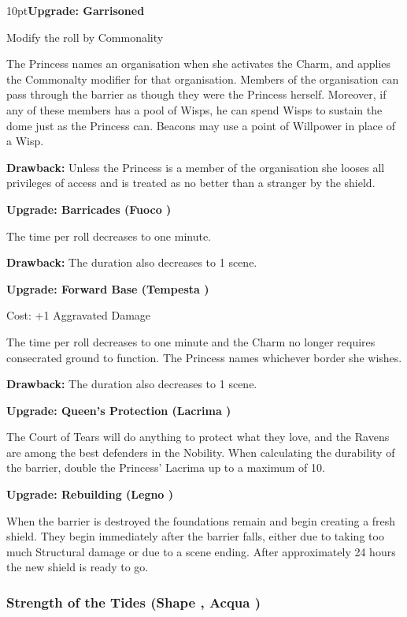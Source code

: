 \begin{myindentpar}{10pt}\textbf{Upgrade: Garrisoned}

Modify the roll by Commonality

The Princess names an organisation when she activates the Charm, and applies the Commonalty modifier for that organisation. Members of the organisation can pass through the barrier as though they were the Princess herself. Moreover, if any of these members has a pool of Wisps, he can spend Wisps to sustain the dome just as the Princess can. Beacons may use a point of Willpower in place of a Wisp. 

\textbf{Drawback:} Unless the Princess is a member of the organisation she looses all privileges of access and is treated as no better than a stranger by the shield.

\textbf{Upgrade: Barricades (Fuoco \textbullet\textbullet\textbullet)}

The time per roll decreases to one minute. 

\textbf{Drawback:} The duration also decreases to 1 scene. 

\textbf{Upgrade: Forward Base (Tempesta \textbullet\textbullet)}

Cost: +1 Aggravated Damage

The time per roll decreases to one minute and the Charm no longer requires consecrated ground to function. The Princess names whichever border she wishes.

\textbf{Drawback:} The duration also decreases to 1 scene. 

\textbf{Upgrade: Queen's Protection (Lacrima \textbullet)}

The Court of Tears will do anything to protect what they love, and the Ravens are among the best defenders in the Nobility. When calculating the durability of the barrier, double the Princess' Lacrima up to a maximum of 10. 

\textbf{Upgrade: Rebuilding (Legno \textbullet\textbullet\textbullet)}

When the barrier is destroyed the foundations remain and begin creating a fresh shield. They begin immediately after the barrier falls, either due to taking too much Structural damage or due to a scene ending. After approximately 24 hours the new shield is ready to go. 

\end{myindentpar}

\subsubsection*{Strength of the Tides (Shape \textbullet\textbullet\textbullet, Acqua \textbullet\textbullet)}


